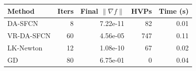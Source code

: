 \begin{tabular}{@{}lrrrr@{}}
\toprule
Method & Iters & Final $\|\nabla f\|$ & HVPs & Time (s) \\
\midrule
DA-SFCN & 8 & 7.22e-11 & 82 & 0.01 \\
VR-DA-SFCN & 60 & 4.56e-05 & 747 & 0.11 \\
LK-Newton & 12 & 1.08e-10 & 67 & 0.02 \\
GD & 80 & 6.75e-01 & 0 & 0.04 \\
\bottomrule
\end{tabular}